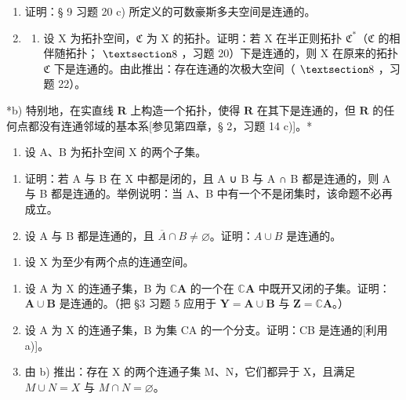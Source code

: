 \BourbakiExerciseGroup

\begin{enumerate}
\def\labelenumi{\arabic{enumi})}
\item
  证明：§ 9 习题 20 c) 所定义的可数豪斯多夫空间是连通的。
\item
  \begin{enumerate}
  \def\labelenumii{\alph{enumii})}
  \tightlist
  \item
    设 X 为拓扑空间，\(\mathfrak{C}\) 为 X 的拓扑。证明：若 X 在半正则拓扑 \(\mathfrak{C}^*\)（\(\mathfrak{C}\) 的相伴随拓扑； \(\S 8\) ，习题 20）下是连通的，则 X 在原来的拓扑 \(\mathfrak{C}\) 下是连通的。由此推出：存在连通的次极大空间（ \(\S 8\) ，习题 22）。
  \end{enumerate}
\end{enumerate}

*b) 特别地，在实直线 \(\mathbf{R}\) 上构造一个拓扑，使得 \(\mathbf{R}\) 在其下是连通的，但 \(\mathbf{R}\) 的任何点都没有连通邻域的基本系{[}参见第四章，§ 2，习题 14 c){]}。*

\begin{enumerate}
\def\labelenumi{\arabic{enumi})}
\setcounter{enumi}{2}
\tightlist
\item
  设 A、B 为拓扑空间 X 的两个子集。
\end{enumerate}

\begin{enumerate}
\def\labelenumi{\alph{enumi})}
\item
  证明：若 A 与 B 在 X 中都是闭的，且 A ∪ B 与 A ∩ B 都是连通的，则 A 与 B 都是连通的。举例说明：当 A、B 中有一个不是闭集时，该命题不必再成立。
\item
  设 A 与 B 都是连通的，且 \(\overline{A} \cap B \neq \varnothing\)。证明：\(A \cup B\) 是连通的。
\end{enumerate}

\begin{enumerate}
\def\labelenumi{\arabic{enumi})}
\setcounter{enumi}{3}
\tightlist
\item
  设 X 为至少有两个点的连通空间。
\end{enumerate}

\begin{enumerate}
\def\labelenumi{\alph{enumi})}
\item
  设 A 为 X 的连通子集，B 为 \(\mathbb{C}\mathbf{A}\) 的一个在 \(\mathbb{C}\mathbf{A}\) 中既开又闭的子集。证明：\(\mathbf{A} \cup \mathbf{B}\) 是连通的。（把 §3 习题 5 应用于 \(\mathbf{Y} = \mathbf{A} \cup \mathbf{B}\) 与 \(\mathbf{Z} = \mathbb{C}\mathbf{A}\)。）
\item
  设 A 为 X 的连通子集，B 为集 CA 的一个分支。证明：CB 是连通的{[}利用 a){]}。
\item
  由 b) 推出：存在 X 的两个连通子集 M、N，它们都异于 X，且满足 \(M \cup N = X\) 与 \(M \cap N = \varnothing\)。
\end{enumerate}

